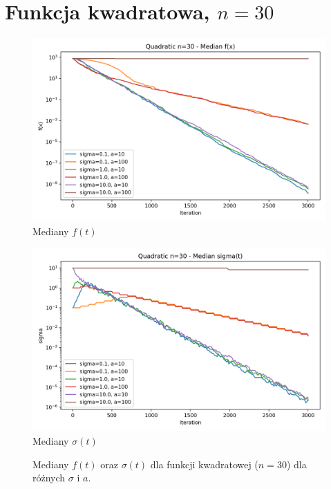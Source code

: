 \documentclass[a4paper,12pt]{article}
\begin{document}
\section{Funkcja kwadratowa, $n=30$}
\begin{figure}[H]
    \centering
    \begin{minipage}{0.48\textwidth}
        \centering
        \includegraphics[width=\textwidth]{charts/Quadratic_n30_all_medians.png}\\
        \small Mediany $f(t)$
    \end{minipage}\hfill
    \begin{minipage}{0.48\textwidth}
        \centering
        \includegraphics[width=\textwidth]{charts/Quadratic_n30_all_sigmas.png}\\
        \small Mediany $\sigma(t)$
    \end{minipage}
    \caption{Mediany $f(t)$ oraz $\sigma(t)$ dla funkcji kwadratowej ($n=30$) dla różnych $\sigma$ i $a$.}
\end{figure}
\end{document}

